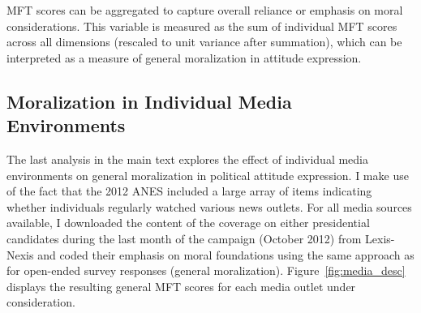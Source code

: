 \documentclass[12pt]{article}
\begin{document}
MFT scores can be aggregated to capture overall reliance or emphasis on moral considerations. This variable is measured as the sum of individual MFT scores across all dimensions (rescaled to unit variance after summation), which can be interpreted as a measure of general moralization in attitude expression.


\clearpage
\subsection{Moralization in Individual Media Environments}

The last analysis in the main text explores the effect of individual media environments on general moralization in political attitude expression. I make use of the fact that the 2012 ANES included a large array of items indicating whether individuals regularly watched various news outlets. For all media sources available, I downloaded the content of the coverage on either presidential candidates during the last month of the campaign (October 2012) from Lexis-Nexis and coded their emphasis on moral foundations using the same approach as for open-ended survey responses (general moralization). Figure~\ref{fig:media_desc} displays the resulting general MFT scores for each media outlet under consideration.
\end{document}
